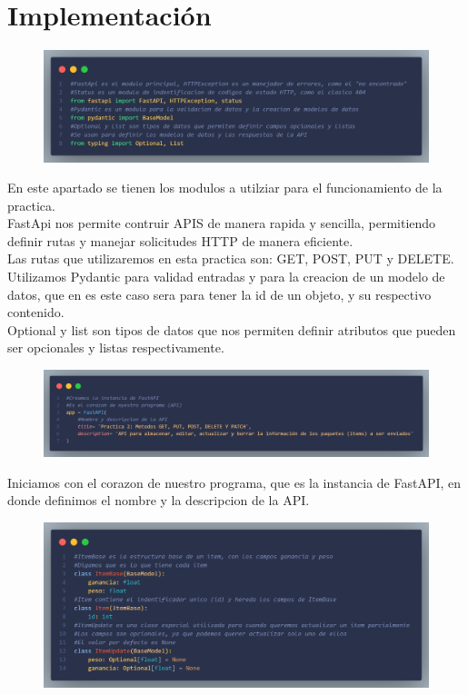 \documentclass[12pt]{article}
\begin{document}
\section{Implementación}
\begin{figure}[h!]
    \centering
    \includegraphics[width=1\textwidth]{Imagenes/Captura1_librerias.png}
\end{figure}

En este apartado se tienen los modulos a utilziar para el funcionamiento de la practica.\\
FastApi nos permite contruir APIS de manera rapida y sencilla, permitiendo definir rutas y manejar solicitudes HTTP de manera eficiente.\\
Las rutas que utilizaremos en esta practica son: GET, POST, PUT y DELETE.\\
Utilizamos Pydantic para validad entradas y para la creacion de un modelo de datos, que en es este caso sera para tener la id de un objeto, y su respectivo contenido.\\
Optional y list son tipos de datos que nos permiten definir atributos que pueden ser opcionales y listas respectivamente.\\


\begin{figure}[h!]
    \centering
    \includegraphics[width=1\textwidth]{Imagenes/Captura2_corazon del programa.png}
\end{figure}

Iniciamos con el corazon de nuestro programa, que es la instancia de FastAPI, en donde definimos el nombre y la descripcion de la API.\\

\begin{figure}[H]
    \centering
    \includegraphics[width=1\textwidth]{Imagenes/Captura3_esctructuradatos.png}
\end{figure}
\end{document}
